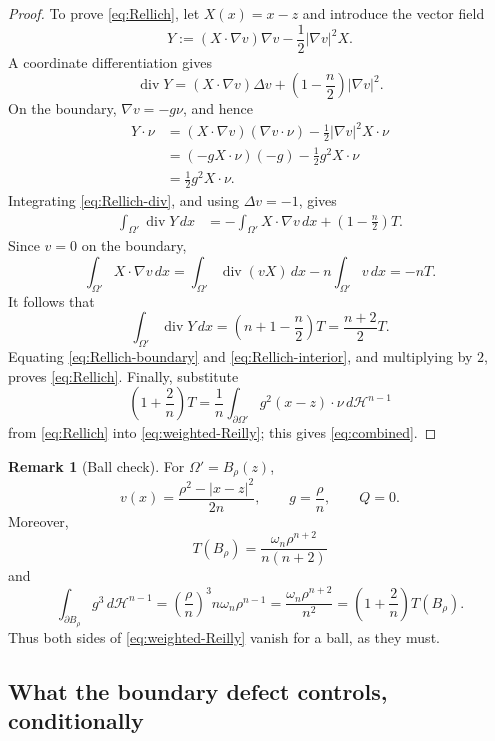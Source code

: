 \documentclass[11pt]{amsart}
\theoremstyle{definition}
\newtheorem{remark}[theorem]{Remark}
\newcommand{\Hn}{\mathcal H^{n-1}}
\newcommand{\Om}{\Omega}
\begin{document}
\begin{proof}
To prove \eqref{eq:Rellich}, let \(X(x)=x-z\) and introduce the vector field
\[
   Y:=(X\cdot\nabla v)\nabla v-\frac12|\nabla v|^2X.
\]
A coordinate differentiation gives
\[
   \operatorname{div}Y
   =(X\cdot\nabla v)\Delta v+
      \left(1-\frac n2\right)|\nabla v|^2.
\tag{5.13}\label{eq:Rellich-div}
\]
On the boundary, \(\nabla v=-g\nu\), and hence
\[
\begin{aligned}
   Y\cdot\nu
   &=(X\cdot\nabla v)(\nabla v\cdot\nu)
     -\frac12|\nabla v|^2X\cdot\nu \\
   &=(-gX\cdot\nu)(-g)-\frac12g^2X\cdot\nu \\
   &=\frac12g^2X\cdot\nu.
\end{aligned}
\tag{5.14}\label{eq:Rellich-boundary}
\]
Integrating \eqref{eq:Rellich-div}, and using \(\Delta v=-1\), gives
\[
\begin{aligned}
   \int_{\Om'}\operatorname{div}Y\,dx
   &=-\int_{\Om'}X\cdot\nabla v\,dx+
      \left(1-\frac n2\right)T.
\end{aligned}
\]
Since \(v=0\) on the boundary,
\[
   \int_{\Om'}X\cdot\nabla v\,dx
   =\int_{\Om'}\operatorname{div}(vX)\,dx-n\int_{\Om'}v\,dx
   =-nT.
\]
It follows that
\[
   \int_{\Om'}\operatorname{div}Y\,dx
   =\left(n+1-\frac n2\right)T
   =\frac{n+2}{2}T.
\tag{5.15}\label{eq:Rellich-interior}
\]
Equating \eqref{eq:Rellich-boundary} and
\eqref{eq:Rellich-interior}, and multiplying by \(2\), proves
\eqref{eq:Rellich}.
Finally, substitute
\[
   \left(1+\frac2n\right)T
   =\frac1n\int_{\partial\Om'}g^2(x-z)\cdot\nu\,d\Hn
\]
from \eqref{eq:Rellich} into \eqref{eq:weighted-Reilly}; this gives
\eqref{eq:combined}.
\end{proof}

\begin{remark}[Ball check]\label{rem:ball-check}
For \(\Om'=B_\rho(z)\),
\[
   v(x)=\frac{\rho^2-|x-z|^2}{2n},\qquad
   g=\frac{\rho}{n},\qquad Q=0.
\]
Moreover,
\[
   T(B_\rho)=\frac{\omega_n\rho^{n+2}}{n(n+2)}
\]
and
\[
   \int_{\partial B_\rho}g^3\,d\Hn
   =\left(\frac{\rho}{n}\right)^3
     n\omega_n\rho^{n-1}
   =\frac{\omega_n\rho^{n+2}}{n^2}
   =\left(1+\frac2n\right)T(B_\rho).
\]
Thus both sides of \eqref{eq:weighted-Reilly} vanish for a ball, as they
must.
\end{remark}

\subsection{What the boundary defect controls, conditionally}
\end{document}
